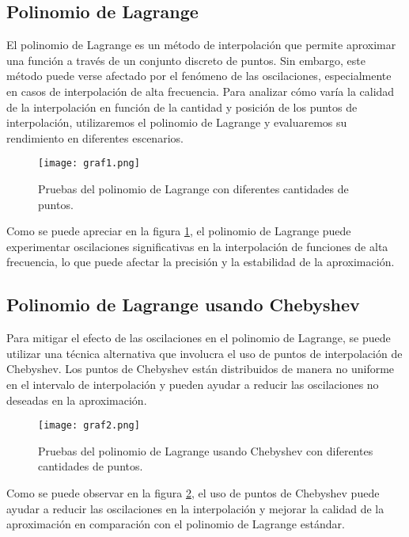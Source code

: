 \documentclass[12pt,a4]{article} %
\begin{document}
\begin{multicols}{2}
\subsection{Polinomio de Lagrange}

El polinomio de Lagrange es un método de interpolación que permite aproximar una función a través de un conjunto discreto de puntos. Sin embargo, este método puede verse afectado por el fenómeno de las oscilaciones, especialmente en casos de interpolación de alta frecuencia. Para analizar cómo varía la calidad de la interpolación en función de la cantidad y posición de los puntos de interpolación, utilizaremos el polinomio de Lagrange y evaluaremos su rendimiento en diferentes escenarios.

\begin{figure} [H]
    \centering
    \texttt{[image: graf1.png]}
    \caption{Pruebas del polinomio de Lagrange con diferentes cantidades de puntos.}
    \label{graf1}
\end{figure}

Como se puede apreciar en la figura \ref{graf1}, el polinomio de Lagrange puede experimentar oscilaciones significativas en la interpolación de funciones de alta frecuencia, lo que puede afectar la precisión y la estabilidad de la aproximación.

\subsection{Polinomio de Lagrange usando Chebyshev}

Para mitigar el efecto de las oscilaciones en el polinomio de Lagrange, se puede utilizar una técnica alternativa que involucra el uso de puntos de interpolación de Chebyshev. Los puntos de Chebyshev están distribuidos de manera no uniforme en el intervalo de interpolación y pueden ayudar a reducir las oscilaciones no deseadas en la aproximación.

\begin{figure} [H]
    \centering
    \texttt{[image: graf2.png]}
    \caption{Pruebas del polinomio de Lagrange usando Chebyshev con diferentes cantidades de puntos.}
    \label{graf2}
\end{figure}

Como se puede observar en la figura \ref{graf2}, el uso de puntos de Chebyshev puede ayudar a reducir las oscilaciones en la interpolación y mejorar la calidad de la aproximación en comparación con el polinomio de Lagrange estándar.


\end{multicols}
\end{document}
